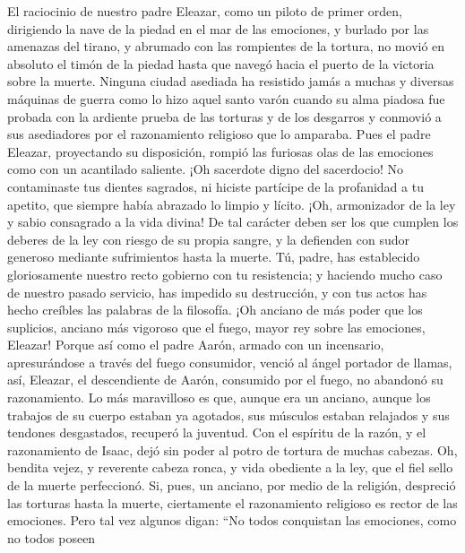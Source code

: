  El raciocinio de nuestro padre Eleazar, como un piloto de
primer orden, dirigiendo la nave de la piedad en el mar de las
emociones,  y burlado por las amenazas del tirano, y
abrumado con las rompientes de la tortura,  no movió en
absoluto el timón de la piedad hasta que navegó hacia el puerto de la
victoria sobre la muerte.  Ninguna ciudad asediada ha
resistido jamás a muchas y diversas máquinas de guerra como lo hizo
aquel santo varón cuando su alma piadosa fue probada con la ardiente
prueba de las torturas y de los desgarros y conmovió a sus asediadores
por el razonamiento religioso que lo amparaba.  Pues el
padre Eleazar, proyectando su disposición, rompió las furiosas olas de
las emociones como con un acantilado saliente.  ¡Oh
sacerdote digno del sacerdocio! No contaminaste tus dientes sagrados, ni
hiciste partícipe de la profanidad a tu apetito, que siempre había
abrazado lo limpio y lícito.  ¡Oh, armonizador de la ley y
sabio consagrado a la vida divina!  De tal carácter deben
ser los que cumplen los deberes de la ley con riesgo de su propia
sangre, y la defienden con sudor generoso mediante sufrimientos hasta la
muerte.  Tú, padre, has establecido gloriosamente nuestro
recto gobierno con tu resistencia; y haciendo mucho caso de nuestro
pasado servicio, has impedido su destrucción, y con tus actos has hecho
creíbles las palabras de la filosofía.  ¡Oh anciano de
más poder que los suplicios, anciano más vigoroso que el fuego, mayor
rey sobre las emociones, Eleazar!  Porque así como el
padre Aarón, armado con un incensario, apresurándose a través del fuego
consumidor, venció al ángel portador de llamas,  así,
Eleazar, el descendiente de Aarón, consumido por el fuego, no abandonó
su razonamiento.  Lo más maravilloso es que, aunque era
un anciano, aunque los trabajos de su cuerpo estaban ya agotados, sus
músculos estaban relajados y sus tendones desgastados, recuperó la
juventud.  Con el espíritu de la razón, y el razonamiento
de Isaac, dejó sin poder al potro de tortura de muchas cabezas.
 Oh, bendita vejez, y reverente cabeza ronca, y vida
obediente a la ley, que el fiel sello de la muerte perfeccionó.
 Si, pues, un anciano, por medio de la religión,
despreció las torturas hasta la muerte, ciertamente el razonamiento
religioso es rector de las emociones.  Pero tal vez
algunos digan: ``No todos conquistan las emociones, como no todos poseen
